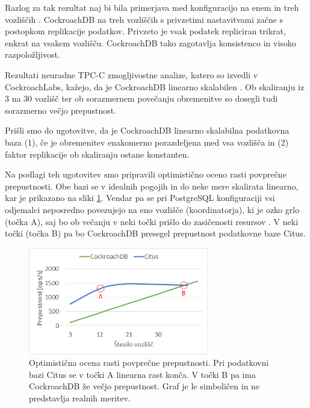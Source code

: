 \documentclass[a4paper, 12pt]{book}
\begin{document}
Razlog za tak rezultat naj bi bila primerjava med konfiguracijo na enem in treh vozliščih \cite{CRDB-YCSB-perf-analisis}. CockroachDB na treh vozliščih s privzetimi nastavitvami začne s postopkom replikacije podatkov. Privzeto je vsak podatek repliciran trikrat, enkrat na vsakem vozlišču. CockroachDB tako zagotavlja konsistenco in visoko razpoložljivost.

Rezultati neuradne TPC-C zmogljivostne analize, katero so izvedli v Co\-ckroachLabs, kažejo, da je CockroachDB linearno skalabilen \cite{CRDB-TPCC-perforamance-report}. Ob skali\-ranju iz 3 na 30 vozlišč ter ob sorazmernem povečanju obremenitve so dosegli tudi sorazmerno večjo prepustnost.

Prišli smo do ugotovitve, da je CockroachDB linearno skalabilna podatkovna baza (1), če je obremenitev enakomerno porazdeljena med vsa vozlišča in (2) faktor replikacije ob skaliranju ostane konstanten.

Na podlagi teh ugotovitev smo pripravili optimistično oceno rasti povprečne prepustnosti. Obe bazi se v idealnih pogojih in do neke mere skalirata linearno, kar je prikazano na sliki \ref{img_ycsb_results_scaling_throughptu_prediction}. Vendar pa se pri PostgreSQL konfiguraciji vsi odjemalci neposredno povezujejo na eno vozlišče (koordinatorja), ki je ozko grlo (točka A), saj bo ob večanju v neki točki prišlo do zasičenosti resursov \cite{Citus-add-coordinator}. V neki točki (točka B) pa bo CockroachDB presegel prepustnost podatkovne baze Citus.

\begin{figure}[H]
\begin{center}
\includegraphics[width=0.7\textwidth]{resources/scaling-throughput-prediction-v2.png}
\end{center}
\caption{Optimistična ocena rasti povprečne prepustnosti. Pri podatkovni bazi Citus se v točki A linearna rast konča. V točki B pa ima CockroachDB že večjo prepustnost. Graf je le simboličen in ne predstavlja realnih meritev.}
\label{img_ycsb_results_scaling_throughptu_prediction}
\end{figure}
\end{document}
